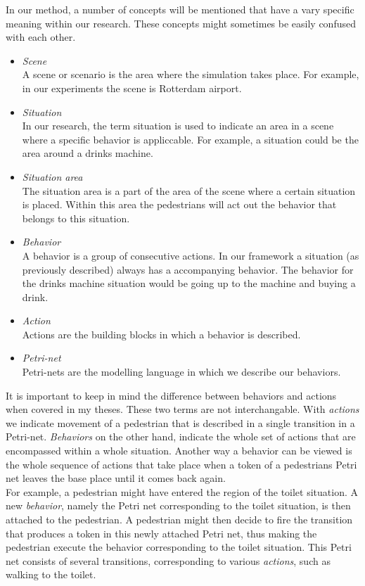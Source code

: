 \documentclass[11pt]{book}
\begin{document}
In our method, a number of concepts will be mentioned that have a vary specific meaning within our research. These concepts might sometimes be easily confused with each other.
\begin{itemize}
\item \emph{Scene}\\
A scene or scenario is the area where the simulation takes place. For example, in our experiments the scene is Rotterdam airport.
\item \emph{Situation}\\
In our research, the term situation is used to indicate an area in a scene where a specific behavior is appliccable. For example, a situation could be the area around a drinks machine.
\item \emph{Situation area}\\
The situation area is a part of the area of the scene where a certain situation is placed. Within this area the pedestrians will act out the behavior that belongs to this situation.
\item \emph{Behavior}\\
A behavior is a group of consecutive actions. In our framework a situation (as previously described) always has a accompanying behavior. The behavior for the drinks machine situation would be going up to the machine and buying a drink.
\item \emph{Action}\\
Actions are the building blocks in which a behavior is described.
\item \emph{Petri-net}\\
Petri-nets are the modelling language in which we describe our behaviors.

\end{itemize}

It is important to keep in mind the difference between behaviors and actions when covered in my theses. These two terms are not interchangable. With \emph{actions} we indicate movement of a pedestrian that is described in a single transition in a Petri-net. \emph{Behaviors} on the other hand, indicate the whole set of actions that are encompassed within a whole situation. Another way a behavior can be viewed is the whole sequence of actions that take place when a token of a pedestrians Petri net leaves the base place until it comes back again. \\
For example, a pedestrian might have entered the region of the toilet situation. A new \emph{behavior}, namely the Petri net corresponding to the toilet situation, is then attached to the pedestrian. A pedestrian might then decide to fire the transition that produces a token in this newly attached Petri net, thus making the pedestrian execute the behavior corresponding to the toilet situation. This Petri net consists of several transitions, corresponding to various \emph{actions}, such as walking to the toilet.
\end{document}
